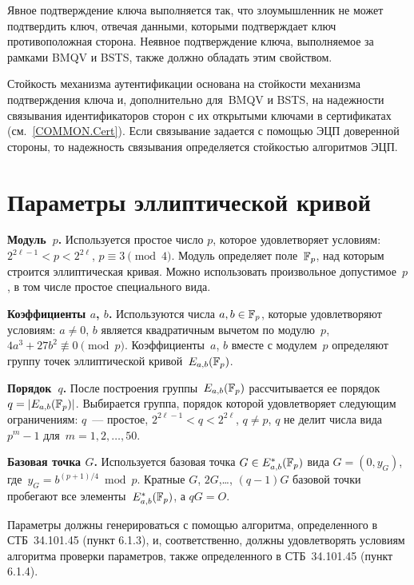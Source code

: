 Явное подтверждение ключа выполняется так, что злоумышленник
не может подтвердить ключ, отвечая данными,
которыми подтверждает ключ противоположная сторона.
%
Неявное подтверждение ключа, выполняемое за рамками BMQV и BSTS, 
также должно обладать этим свойством.

Стойкость механизма аутентификации основана на 
стойкости механизма подтверждения ключа и, дополнительно 
для~BMQV и BSTS, на надежности связывания 
идентификаторов сторон с их открытыми ключами в сертификатах 
(см.~\ref{COMMON.Cert}).
%
Если связывание задается с помощью ЭЦП доверенной стороны,
то надежность связывания определяется стойкостью алгоритмов ЭЦП.


\section{Параметры эллиптической кривой}\label{COMMON.Params}

{\bf Модуль~$p$.} 
Используется простое число $p$, которое удовлетворяет условиям:
$2^{2\ell-1}<p<2^{2\ell}$, $p\equiv 3\pmod{4}$.
%
Модуль определяет поле~$\mathbb{F}_p$, 
над которым строится эллиптическая кривая.
%
Можно использовать произвольное допустимое~$p$, 
в том числе простое специального вида.

{\bf Коэффициенты $a$, $b$.} 
Используются числа $a,b\in\mathbb{F}_p$, которые удовлетворяют условиям:
$a\neq 0$,
$b$ является квадратичным вычетом по модулю~$p$,
$4a^3+27b^2\not\equiv 0\pmod{p}$.
%
Коэффициенты~$a$, $b$ вместе с модулем~$p$ 
определяют группу точек эллиптической кривой~$E_{a,b}(\mathbb{F}_p)$.

{\bf Порядок~$q$.}
После построения группы~$E_{a,b}(\mathbb{F}_p)$ рассчитывается 
ее порядок~$q=|E_{a,b}(\mathbb{F}_p)|$.
%
Выбирается группа, порядок которой удовлетворяет следующим ограничениям:
$q$~--- простое,
$2^{2\ell-1}<q<2^{2\ell}$,
$q\neq p$,
$q$ не делит числа вида $p^m-1$ для~$m=1,2,\ldots,50$.

{\bf Базовая точка $G$.}
Используется базовая
точка $G\in E_{a,b}^*(\mathbb{F}_p)$ вида $G=(0,y_G)$,
где~$y_G=b^{(p+1)/4}\bmod{p}$.
%
Кратные $G$, $2G$,\ldots, $(q-1)G$ базовой точки
пробегают все элементы~$E_{a,b}^*(\mathbb{F}_p)$, а $qG=O$.

Параметры должны генерироваться с помощью алгоритма, определенного в
СТБ~34.101.45 (пункт 6.1.3), и, соответственно, должны удовлетворять 
условиям алгоритма проверки параметров, также определенного в СТБ~34.101.45 
(пункт 6.1.4).

